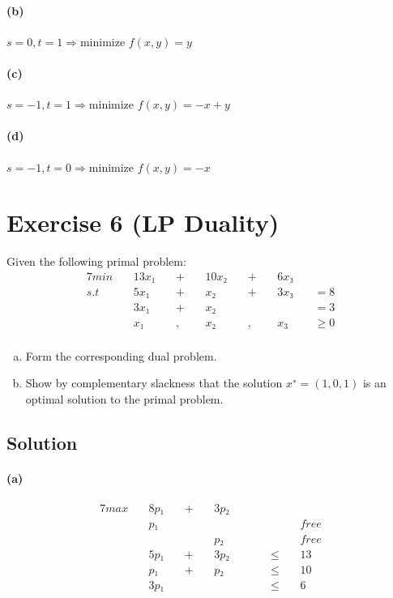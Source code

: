 \documentclass[a4paper, 12pt]{report}
\begin{document}
\paragraph{(b)} $s=0, t=1 ⇒ \text{minimize } f(x,y) = y$

\paragraph{(c)} $s=-1, t=1 ⇒ \text{minimize } f(x,y) = -x+y$

\paragraph{(d)} $s=-1, t=0 ⇒ \text{minimize } f(x,y) = -x$

\section{Exercise 6 (LP Duality)}

Given the following primal problem:
\begin{alignat*}{7}
    min ~&& 13x₁ ~&& + ~&& 10x₂ ~&& + ~&& 6x₃ ~&&  \\
    s.t ~&& 5x₁  ~&& + ~&& x₂   ~&& + ~&& 3x₃ ~&&  = 8\\
        ~&& 3x₁  ~&& + ~&& x₂   ~&&   ~&&     ~&&  = 3\\
        ~&& x₁   ~&& , ~&& x₂   ~&& , ~&& x_3 ~&&  ≥0\\
\end{alignat*}
\begin{enumerate}[(a)]
    \item Form the corresponding dual problem.
    \item Show by complementary slackness that the solution $x^∗ = (1, 0, 1)$
          is an optimal solution to the primal problem.
\end{enumerate}

\subsection{Solution}

\paragraph{(a)}
\begin{alignat*}{7}
    max ~&& 8p₁ ~&& +  ~&& 3p₂ ~&&   ~&&   ~&&\\
        ~&& p₁  ~&&    ~&&     ~&&   ~&&   ~&& free\\
        ~&&     ~&&    ~&&  p₂ ~&&   ~&&   ~&& free\\
        ~&& 5p₁ ~&& +  ~&& 3p₂ ~&&   ~&& ≤ ~&& 13\\
        ~&&  p₁ ~&& +  ~&&  p₂ ~&&   ~&& ≤ ~&& 10\\
        ~&& 3p₁ ~&&    ~&&     ~&&   ~&& ≤ ~&& 6\\
\end{alignat*}
\end{document}

